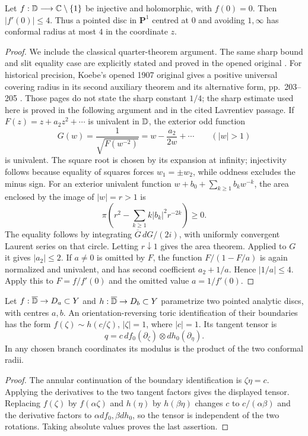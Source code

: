 \begin{lemma}\label{A1-cap-bound}
Let $f:{\mathbb{D}}\longrightarrow{\ensuremath{\mathbb{C}}}\setminus\{1\}$ be injective and holomorphic, with $f(0)=0$. Then $|f'(0)|\leq4$. Thus a pointed disc in $\mathbf P^1$ centred at $0$ and avoiding $1,\infty$ has conformal radius at most $4$ in the coordinate $z$.
\end{lemma}
\begin{proof}
We include the classical quarter-theorem argument. The same sharp
bound and slit equality case are explicitly stated and proved in the
opened original \cite[\S2, pp.~173--174]{ALavrentiev1934}.
For historical precision, Koebe's opened 1907 original gives a positive
universal covering radius in its second auxiliary theorem and its
alternative form, pp.~203--205 \cite{AKoebe1907}. Those pages do not
state the sharp constant $1/4$; the sharp estimate used here is proved
in the following argument and in the cited Lavrentiev passage.
If $F(z)=z+a_2z^2+\cdots$ is univalent in ${\mathbb{D}}$, the exterior odd function
\[
G(w)=\frac{1}{\sqrt{F(w^{-2})}}=w-\frac{a_2}{2w}+\cdots\qquad(|w|>1)
\]
is univalent. The square root is chosen by its expansion at infinity; injectivity follows because equality of squares forces $w_1=\pm w_2$, while oddness excludes the minus sign. For an exterior univalent function $w+b_0+\sum_{k\geq1}b_kw^{-k}$, the area enclosed by the image of $|w|=r>1$ is
\[
\pi\left(r^2-\sum_{k\geq1}k|b_k|^2r^{-2k}\right)\geq0.
\]
The equality follows by integrating $\overline G\,dG/(2i)$, with uniformly convergent Laurent series on that circle. Letting $r\downarrow1$ gives the area theorem. Applied to $G$ it gives $|a_2|\leq2$. If $a\ne0$ is omitted by $F$, the function $F/(1-F/a)$ is again normalized and univalent, and has second coefficient $a_2+1/a$. Hence $|1/a|\leq4$. Apply this to $F=f/f'(0)$ and the omitted value $a=1/f'(0)$.
\end{proof}
\begin{lemma}\label{A1-tensor}
Let $f:\overline{{\mathbb{D}}}\to D_a\subset Y$ and $h:\overline{{\mathbb{D}}}\to D_b\subset Y$ parametrize two pointed analytic discs, with centres $a,b$. An orientation-reversing toric identification of their boundaries has the form $f(\zeta)\sim h(c/\zeta)$, $|\zeta|=1$, where $|c|=1$. Its tangent tensor is
\[
q=c\,df_0(\partial_\zeta)\otimes dh_0(\partial_\eta).
\]
In any chosen branch coordinates its modulus is the product of the two conformal radii.
\end{lemma}
\begin{proof}
The annular continuation of the boundary identification is $\zeta\eta=c$. Applying the derivatives to the two tangent factors gives the displayed tensor. Replacing $f(\zeta)$ by $f(\alpha\zeta)$ and $h(\eta)$ by $h(\beta\eta)$ changes $c$ to $c/(\alpha\beta)$ and the derivative factors to $\alpha df_0,\beta dh_0$, so the tensor is independent of the two rotations. Taking absolute values proves the last assertion.
\end{proof}

